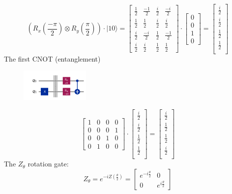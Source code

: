 \documentclass{article}
\begin{document}
\[
	\left(R_x(\frac{-\pi}{2}) \otimes R_y(\frac{\pi}{2})\right) \cdot |10 \rangle =
	\begin{bmatrix}
		\frac{1}{2} & \frac{-1}{2} & \frac{i}{2} & \frac{-i}{2} \\
		\frac{1}{2} & \frac{1}{2}  & \frac{i}{2} & \frac{i}{2}  \\
		\frac{i}{2} & \frac{-i}{2} & \frac{1}{2} & \frac{-1}{2} \\
		\frac{i}{2} & \frac{i}{2}  & \frac{1}{2} & \frac{1}{2}
	\end{bmatrix}
	\cdot
	\begin{bmatrix}
		0 \\
		0 \\
		1 \\
		0
	\end{bmatrix}
	=
	\begin{bmatrix}
		\frac{i}{2} \\
		\frac{i}{2} \\
		\frac{1}{2} \\
		\frac{1}{2} \\
	\end{bmatrix}
\]
The first CNOT (entanglement)
\begin{figure}[H]
	\centering
	\includegraphics[width=0.3\textwidth, height=0.15\textheight]{1cnot.png}

\end{figure}
\[
	\begin{bmatrix}
		1 & 0 & 0 & 0 \\
		0 & 0 & 0 & 1 \\
		0 & 0 & 1 & 0 \\
		0 & 1 & 0 & 0
	\end{bmatrix}
	\cdot
	\begin{bmatrix}
		\frac{i}{2} \\
		\frac{i}{2} \\
		\frac{1}{2} \\
		\frac{1}{2} \\
	\end{bmatrix}
	=
	\begin{bmatrix}
		\frac{i}{2} \\
		\frac{1}{2} \\
		\frac{1}{2} \\
		\frac{i}{2} \\
	\end{bmatrix}
\]
The \(Z_\theta\) rotation gate:
\[
	Z_\theta = e^{-iZ(\frac{\theta}{2})} =
	\begin{bmatrix}
		e^{-i \frac{\theta}{2}} & 0                      \\
		0                       & e^{i \frac{\theta}{2}}
	\end{bmatrix}
\]
\end{document}
